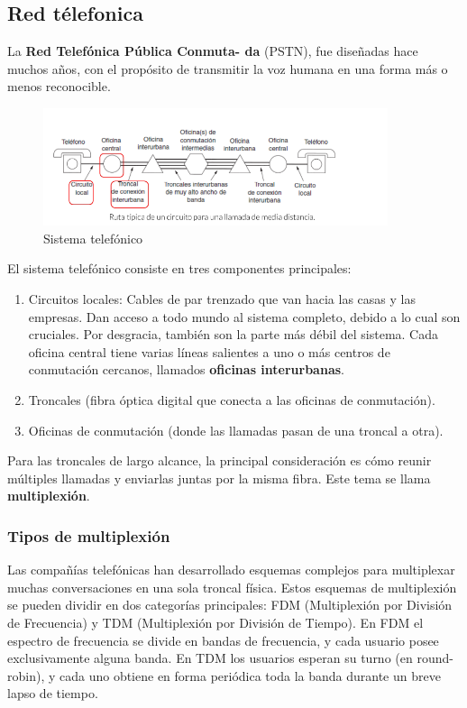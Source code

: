 \subsection{Red télefonica}
La \textbf{Red Telefónica Pública Conmuta-
da} (PSTN), fue diseñadas hace muchos años, con el propósito de transmitir la voz humana en una forma más o menos reconocible.

\begin{figure}[H]
	\centering
	\includegraphics[width=0.9\textwidth
]{images/redes-telefonicas.png}
	\caption[Sistema  telefónico]{Sistema  telefónico}
	\label{fig:sistema-telefonico}
\end{figure}

El sistema telefónico consiste en tres componentes principales:
\begin{enumerate}
  \item Circuitos locales: Cables de par trenzado que van hacia las casas y las empresas. Dan acceso a todo mundo al sistema completo, debido a lo cual son cruciales. Por desgracia, también son la parte más débil del sistema. Cada oficina central tiene varias líneas salientes a uno o más centros de conmutación cercanos, llamados \textbf{oficinas interurbanas}.
  \item Troncales (fibra óptica digital que conecta a las oficinas de conmutación).
  \item Oficinas de conmutación (donde las llamadas pasan de una troncal a otra).
\end{enumerate}

Para las troncales de largo alcance, la principal consideración es cómo reunir múltiples llamadas y
enviarlas juntas por la misma fibra. Este tema se llama \textbf{multiplexión}.

\subsubsection{Tipos de multiplexión}
Las compañías telefónicas han desarrollado esquemas complejos para multiplexar muchas conversaciones en una sola troncal física. Estos esquemas de multiplexión se pueden dividir en dos categorías principales: FDM (Multiplexión por División de Frecuencia) y TDM (Multiplexión por División de Tiempo). En FDM el espectro de frecuencia se divide en bandas de frecuencia, y cada usuario posee exclusivamente alguna banda. En TDM los usuarios esperan su turno (en round-robin), y cada uno obtiene en forma periódica toda la banda durante un breve lapso de tiempo.

